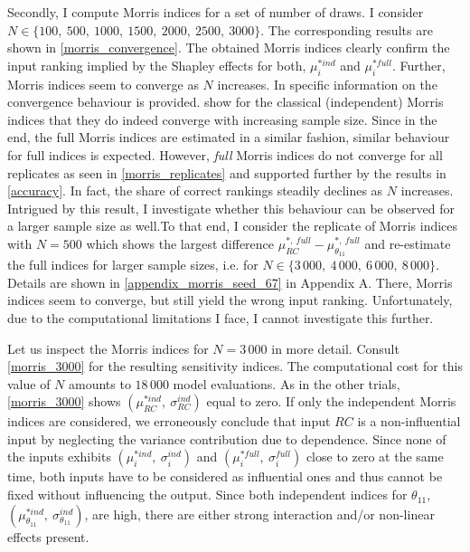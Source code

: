 Secondly, I compute Morris indices for a set of number of draws. I consider $N \in \{100,\ 500,\ 1000,\ 1500,\ 2000,\ 2500,\ 3000\}$. The corresponding results are shown in \cref{morris_convergence}. The obtained Morris indices clearly confirm the input ranking implied by the Shapley effects for both, $\mu^{\ast ind}_i$ and $\mu^{\ast full}_i$. Further, Morris indices
seem to converge as $N$ increases. In  specific information on the convergence behaviour is provided. \citet{ASAV19} show for the classical (independent) Morris indices that they do indeed converge with increasing sample size. Since in the end, the full Morris indices are estimated in a similar fashion, similar behaviour for full indices is expected. However, \textit{full} Morris indices do not converge for all replicates as seen in \cref{morris_replicates} and supported further by the results in \cref{accuracy}. In fact, the share of correct rankings steadily declines as $N$ increases. Intrigued by this result, I investigate whether this behaviour can be observed for a larger sample size as well.To that end, I consider the replicate of Morris indices with $N=500$ which shows the largest difference $\mu^{\ast,\ full}_{RC} - \mu^{\ast,\ full}_{\theta_{11}}$ and re-estimate the full indices for larger sample sizes, i.e. for $N \in \{3\,000,\ 4\,000,\ 6\,000,\ 8\,000\}$. Details are shown in \cref{appendix_morris_seed_67} in Appendix A. There, Morris indices seem to converge, but still yield the wrong input ranking. Unfortunately, due to the computational limitations I face, I cannot investigate this further.

Let us inspect the Morris indices for $N = 3\,000$ in more detail. Consult \cref{morris_3000} for the
resulting sensitivity indices. The computational cost for this value of $N$ amounts to $18\,000$
model evaluations. As in the other trials, \cref{morris_3000} shows $(\mu^{\ast ind}_{RC},\ \sigma_{RC}^{ind})$ equal to zero.
If only the independent Morris indices are considered, we erroneously
conclude that input $RC$ is a non-influential input by neglecting the variance contribution due to dependence. Since none of the inputs exhibits $(\mu^{\ast ind}_i,\ \sigma_i^{ind})$ and $(\mu^{\ast full}_i,\ \sigma_i^{full})$ close to zero at the same time, both inputs have to be considered as influential ones and thus cannot be fixed without influencing the output.
Since both independent indices for $\theta_{11}$, $(\mu^{\ast ind}_{\theta_{11}},\ \sigma_{\theta_{11}}^{ind})$, are high, there are either strong interaction and/or non-linear effects present.

